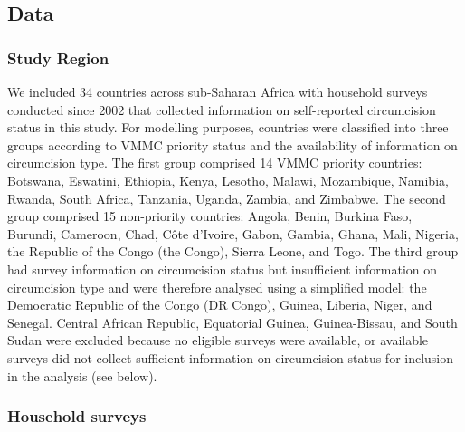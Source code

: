 \documentclass{article}
\begin{document}

\subsection*{Data}


\subsubsection*{Study Region}


We included 34 countries across sub-Saharan Africa with household surveys conducted since 2002 that collected information on self-reported circumcision status in this study. For modelling purposes, countries were classified into three groups according to VMMC priority status and the availability of information on circumcision type. The first group comprised 14 VMMC priority countries: Botswana, Eswatini, Ethiopia, Kenya, Lesotho, Malawi, Mozambique, Namibia, Rwanda, South Africa, Tanzania, Uganda, Zambia, and Zimbabwe. The second group comprised 15 non-priority countries: Angola, Benin, Burkina Faso, Burundi, Cameroon, Chad, Côte d’Ivoire, Gabon, Gambia, Ghana, Mali, Nigeria, the Republic of the Congo (the Congo), Sierra Leone, and Togo. The third group had survey information on circumcision status but insufficient information on circumcision type and were therefore analysed using a simplified model: the Democratic Republic of the Congo (DR Congo), Guinea, Liberia, Niger, and Senegal. Central African Republic, Equatorial Guinea, Guinea-Bissau, and South Sudan were excluded because no eligible surveys were available, or available surveys did not collect sufficient information on circumcision status for inclusion in the analysis (see below).


\subsubsection*{Household surveys}
\end{document}
